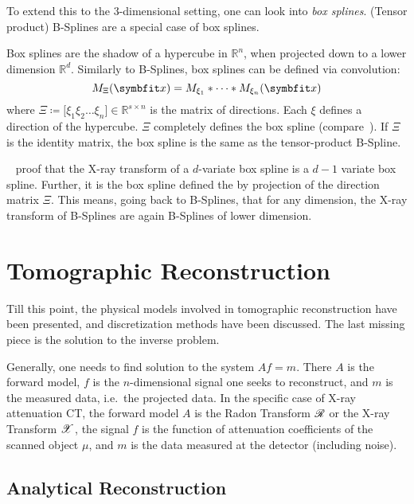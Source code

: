 To extend this to the \(3\)-dimensional setting, one can look into \textit{box splines}. (Tensor
product) B-Splines are a special case of box splines.
\begin{definition}\label{def:box_splines}
	Box splines are the shadow of a hypercube in \(\mathbb{R}^n\), when projected down to a
	lower dimension \(\mathbb{R}^d\). Similarly to B-Splines, box splines can be defined via
	convolution:
	\begin{equation}
		M_\Xi(\mvec{x}) = M_{\xi_1} * \dots * M_{\xi_n}(\mvec{x})
	\end{equation}
	where \(\Xi \coloneq \mathopen[ \xi_1 \xi_2 \dots \xi_n \mathclose] \in \mathbb{R}^{s \times
		n}\) is the matrix of directions. Each \(\xi\) defines a direction of the hypercube. \(\Xi\)
	completely defines the box spline (compare~\cite{de_boor_box_1993}). If \(\Xi\) is the
	identity matrix, the box spline is the same as the tensor-product B-Spline.
\end{definition}

\citeauthor*{entezari_box_2012}~\cite{entezari_box_2012} proof that the X-ray transform of a
\(d\)-variate box spline is a \(d - 1\) variate box spline. Further, it is the box spline defined
the by projection of the direction matrix \(\Xi\). This means, going back to B-Splines, that for any
dimension, the X-ray transform of B-Splines are again B-Splines of lower dimension.

\chapter{Tomographic Reconstruction}\label{chap:tomographic_reconstruction}

Till this point, the physical models involved in tomographic reconstruction have been presented, and
discretization methods have been discussed. The last missing piece is the solution to the inverse
problem.

Generally, one needs to find solution to the system \(Af = m\). There \(A\) is the forward model,
\(f\) is the \(n\)-dimensional signal one seeks to reconstruct, and \(m\) is the measured data, i.e.\
the projected data. In the specific case of X-ray attenuation CT, the forward model \(A\) is the
Radon Transform \(\mathscr{R}\) or the X-ray Transform \(\mathscr{X}\), the signal \(f\) is the function of
attenuation coefficients of the scanned object \(\mu\), and \(m\) is the data measured at the
detector (including noise).

\section{Analytical Reconstruction}\label{sec:analytical_reconstruction}

